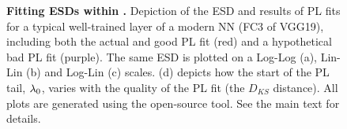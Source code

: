 

\begin{figure}[t] %
    \centering
    \caption{\textbf{Fitting ESDs within \HTSR.} 
         Depiction of the ESD and results of PL fits for a typical well-trained layer of a modern NN (FC3 of VGG19), including both the actual and good PL fit (red) and a hypothetical bad PL fit (purple). 
         The same ESD is plotted on a Log-Log (a), Lin-Lin (b) and Log-Lin (c) scales.
         (d) depicts how the start of the PL tail, $\lambda_{0}$, varies with the quality of the PL fit (the $D_{KS}$ distance). 
         All plots are generated using the open-source \WW tool. 
         See the main text for details.
    }
  \label{fig:log-esds}
\end{figure}   


